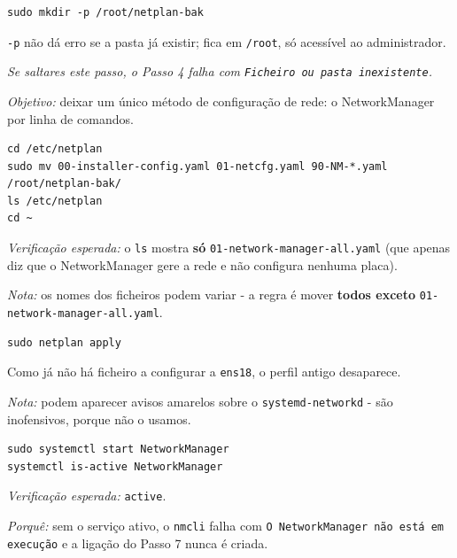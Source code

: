 \begin{lstlisting}[style=bashstyle]
sudo mkdir -p /root/netplan-bak
\end{lstlisting}

\texttt{-p} não dá erro se a pasta já existir; fica em \texttt{/\allowbreak{}root}, só acessível ao administrador.

\emph{Se saltares este passo, o Passo 4 falha com \texttt{Ficheiro ou pasta inexistente}.}


\emph{Objetivo:} deixar um único método de configuração de rede: o NetworkManager por linha de comandos.

\begin{lstlisting}[style=bashstyle]
cd /etc/netplan
sudo mv 00-installer-config.yaml 01-netcfg.yaml 90-NM-*.yaml /root/netplan-bak/
ls /etc/netplan
cd ~
\end{lstlisting}

\emph{Verificação esperada:} o \texttt{ls} mostra \textbf{só} \texttt{01-network-manager-all.yaml} (que apenas diz que o NetworkManager gere a rede e não configura nenhuma placa).

\emph{Nota:} os nomes dos ficheiros podem variar - a regra é mover \textbf{todos exceto} \texttt{01-network-manager-all.yaml}.


\begin{lstlisting}[style=bashstyle]
sudo netplan apply
\end{lstlisting}

Como já não há ficheiro a configurar a \texttt{ens18}, o perfil antigo desaparece.

\emph{Nota:} podem aparecer avisos amarelos sobre o \texttt{systemd-networkd} - são inofensivos, porque não o usamos.


\begin{lstlisting}[style=bashstyle]
sudo systemctl start NetworkManager
systemctl is-active NetworkManager
\end{lstlisting}

\emph{Verificação esperada:} \texttt{active}.

\emph{Porquê:} sem o serviço ativo, o \texttt{nmcli} falha com \texttt{O NetworkManager não está em execução} e a ligação do Passo 7 nunca é criada.


